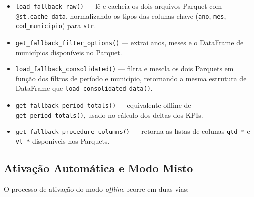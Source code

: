 \documentclass[12pt,a4paper]{report}
\begin{document}
\begin{itemize}
    \item \texttt{load\_fallback\_raw()} — lê e cacheia os dois arquivos Parquet com
    \texttt{@st.cache\_data}, normalizando os tipos das colunas-chave (\texttt{ano},
    \texttt{mes}, \texttt{cod\_municipio}) para \texttt{str}.
    \item \texttt{get\_fallback\_filter\_options()} — extrai anos, meses e o DataFrame
    de municípios disponíveis no Parquet.
    \item \texttt{load\_fallback\_consolidated()} — filtra e mescla os dois Parquets
    em função dos filtros de período e município, retornando a mesma estrutura de
    DataFrame que \texttt{load\_consolidated\_data()}.
    \item \texttt{get\_fallback\_period\_totals()} — equivalente offline de
    \texttt{get\_period\_totals()}, usado no cálculo dos deltas dos KPIs.
    \item \texttt{get\_fallback\_procedure\_columns()} — retorna as listas de colunas
    \texttt{qtd\_*} e \texttt{vl\_*} disponíveis nos Parquets.
\end{itemize}

\subsection{Ativação Automática e Modo Misto}

O processo de ativação do modo \textit{offline} ocorre em duas vias:
\end{document}
